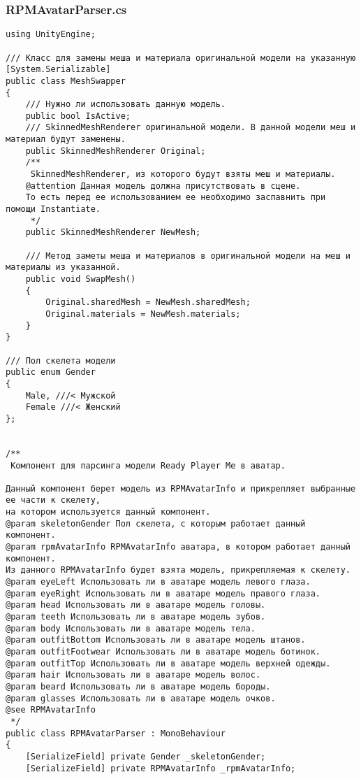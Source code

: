 \subsubsection*{RPMAvatarParser.cs}
\begin{verbatim}
﻿using UnityEngine;

/// Класс для замены меша и материала оригинальной модели на указанную
[System.Serializable]
public class MeshSwapper
{
    /// Нужно ли использовать данную модель.
    public bool IsActive;
    /// SkinnedMeshRenderer оригинальной модели. В данной модели меш и материал будут заменены.
    public SkinnedMeshRenderer Original;
    /** 
     SkinnedMeshRenderer, из которого будут взяты меш и материалы.
    @attention Данная модель должна присутствовать в сцене. 
    То есть перед ее использованием ее необходимо заспавнить при помощи Instantiate.
     */
    public SkinnedMeshRenderer NewMesh;

    /// Метод заметы меша и материалов в оригинальной модели на меш и материалы из указанной.
    public void SwapMesh()
    {
        Original.sharedMesh = NewMesh.sharedMesh;
        Original.materials = NewMesh.materials;
    }
}

/// Пол скелета модели
public enum Gender
{
    Male, ///< Мужской
    Female ///< Женский
};


/**
 Компонент для парсинга модели Ready Player Me в аватар.

Данный компонент берет модель из RPMAvatarInfo и прикрепляет выбранные ее части к скелету, 
на котором используется данный компонент.
@param skeletonGender Пол скелета, с которым работает данный компонент.
@param rpmAvatarInfo RPMAvatarInfo аватара, в котором работает данный компонент. 
Из данного RPMAvatarInfo будет взята модель, прикрепляемая к скелету.
@param eyeLeft Использовать ли в аватаре модель левого глаза.
@param eyeRight Использовать ли в аватаре модель правого глаза.
@param head Использовать ли в аватаре модель головы.
@param teeth Использовать ли в аватаре модель зубов.
@param body Использовать ли в аватаре модель тела.
@param outfitBottom Использовать ли в аватаре модель штанов.
@param outfitFootwear Использовать ли в аватаре модель ботинок.
@param outfitTop Использовать ли в аватаре модель верхней одежды.
@param hair Использовать ли в аватаре модель волос.
@param beard Использовать ли в аватаре модель бороды.
@param glasses Использовать ли в аватаре модель очков.
@see RPMAvatarInfo
 */
public class RPMAvatarParser : MonoBehaviour
{
    [SerializeField] private Gender _skeletonGender;
    [SerializeField] private RPMAvatarInfo _rpmAvatarInfo;


\end{verbatim}
